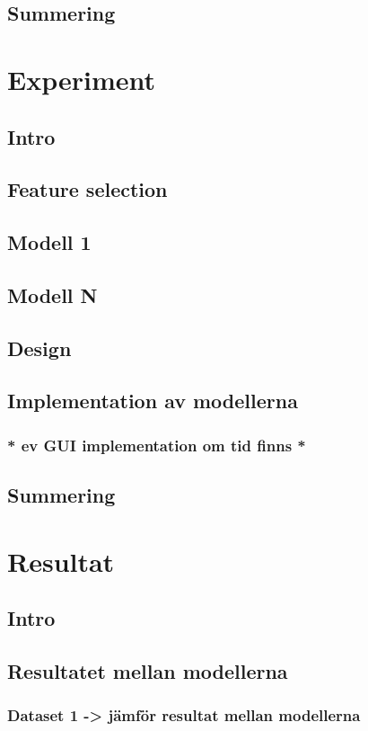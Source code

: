 \documentclass{kaumasters} %
\begin{document}
\section{Summering}

\newpage

\chapter{Experiment}
\section{Intro}
\section{Feature selection}
\section{Modell 1}
\section{Modell N}
\section{Design}
\section{Implementation av modellerna}
\subsection{* ev GUI implementation om tid finns *}
\section{Summering}


\newpage

\chapter{Resultat}
\section{Intro}
\section{Resultatet mellan modellerna}
\subsection{Dataset 1 -> jämför resultat mellan modellerna}
\end{document}
